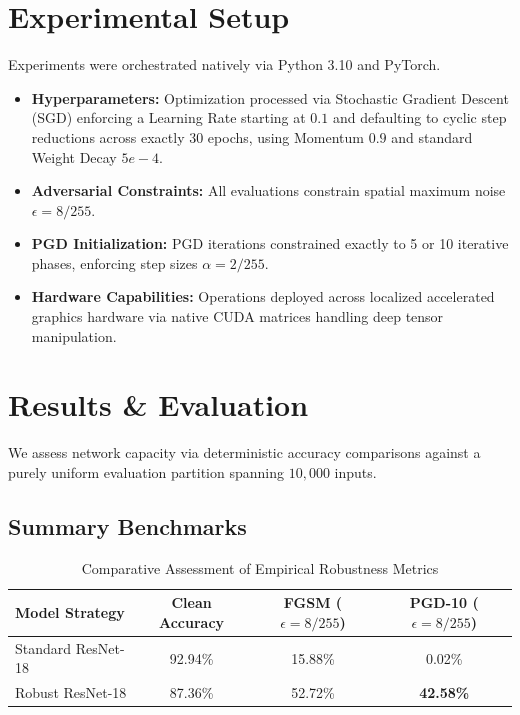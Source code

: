 \documentclass[12pt,a4paper]{article}
\begin{document}
\section{Experimental Setup}
Experiments were orchestrated natively via Python 3.10 and PyTorch. 
\begin{itemize}
    \item \textbf{Hyperparameters:} Optimization processed via Stochastic Gradient Descent (SGD) enforcing a Learning Rate starting at $0.1$ and defaulting to cyclic step reductions across exactly $30$ epochs, using Momentum $0.9$ and standard Weight Decay $5e-4$.
    \item \textbf{Adversarial Constraints:} All evaluations constrain spatial maximum noise $\epsilon = 8/255$.
    \item \textbf{PGD Initialization:} PGD iterations constrained exactly to 5 or 10 iterative phases, enforcing step sizes $\alpha=2/255$.
    \item \textbf{Hardware Capabilities:} Operations deployed across localized accelerated graphics hardware via native CUDA matrices handling deep tensor manipulation.
\end{itemize}


\section{Results \& Evaluation}
We assess network capacity via deterministic accuracy comparisons against a purely uniform evaluation partition spanning $10,000$ inputs.

\subsection{Summary Benchmarks}
\begin{table}[H]
    \centering
    \begin{tabular}{l|ccc}
        \toprule
        \textbf{Model Strategy} & \textbf{Clean Accuracy} & \textbf{FGSM ($\epsilon=8/255$)} & \textbf{PGD-10 ($\epsilon=8/255$)} \\
        \midrule
        Standard ResNet-18 & 92.94\% & 15.88\% & 0.02\% \\
        Robust ResNet-18 & 87.36\% & 52.72\% & \textbf{42.58\%} \\
        \bottomrule
    \end{tabular}
    \caption{Comparative Assessment of Empirical Robustness Metrics}
    \label{tab:results}
\end{table}
\end{document}
